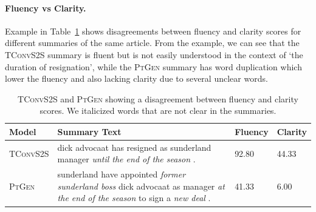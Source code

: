 \documentclass[11pt,a4paper]{article}
\newcommand\highres{\textsc{HighRES}}
\newcommand\ptgen{\textsc{PtGen}}
\newcommand\tconv{\textsc{TConvS2S}}
\begin{document}
\paragraph{Fluency vs Clarity.} Example in Table~\ref{table:fluencyclarityexample} shows disagreements between fluency and clarity scores for different summaries of the same article. From the example, we can see that the \tconv{} summary is fluent but is not easily understood in the context of `the duration of resignation', while the \ptgen{} summary has word duplication which lower the fluency and also lacking clarity due to several unclear words. 
\begin{table}[t!]
\small
\begin{tabular}{p{1.5cm}|p{3.5cm}|p{0.7cm}p{0.7cm}}
\hline
\textbf{Model}     & \textbf{Summary Text}  & \textbf{Fluency} & \textbf{Clarity} \\
\hline
\tconv{}  & dick advocaat has resigned as sunderland manager \textit{until the end of the season} .                                          & 92.80   & 44.33   \\
\ptgen{}     & sunderland have appointed \textit{former sunderland boss} dick advocaat as manager \textit{at the end of the season} to sign a \textit{new deal} . & 41.33   & 6.00    \\
\hline
\end{tabular}
\caption{%
\tconv{} and \ptgen{} showing a disagreement between fluency and clarity scores. We italicized words that are not clear in the summaries.}
\label{table:fluencyclarityexample}
\end{table}
\end{document}

